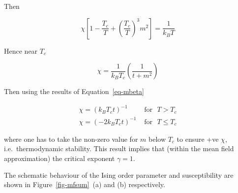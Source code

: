 \documentclass[
  letterpaper,
  enabledeprecatedfontcommands]{report}
\begin{document}
Then

\[\chi \left[ 1-\frac{T_c}{T} +\left(\frac{T_c}{T}\right)^3m^2  \right]=\frac{1}{k_BT}\]

Hence near \(T_c\)

\[\chi=\frac{1}{k_BT_c}\left(\frac{1}{t+m^2}\right)\]

Then using the results of Equation~\ref{eq-mbeta}

\[
\begin{aligned}
\chi= (k_BT_ct)^{-1} & \textrm{ for} ~~~ T> T_c \\
\chi= (-2k_BT_ct)^{-1} & \textrm{ for}  ~~~T \le T_c 
\end{aligned} 
\]

where one has to take the non-zero value for \(m\) below \(T_c\) to
ensure +ve \(\chi\), i.e.~thermodynamic stability. This result implies
that (within the mean field approximation) the critical exponent
\(\gamma=1\).

The schematic behaviour of the Ising order parameter and susceptibility
are shown in Figure~\ref{fig-mfsum}~(a) and (b) respectively.
\end{document}
